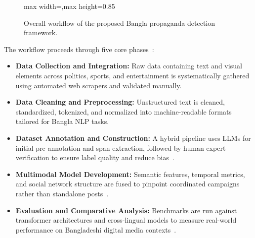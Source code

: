 \begin{figure}[H]
\begin{adjustbox}{max width=\textwidth,max height=0.85\textheight}
\end{adjustbox}
\caption{Overall workflow of the proposed Bangla propaganda detection framework.}
\label{fig:workflow}
\end{figure}

The workflow proceeds through five core phases~\cite{ng2023}:
\begin{itemize}
  \item \textbf{Data Collection and Integration:} Raw data containing text and
        visual elements across politics, sports, and entertainment is
        systematically gathered using automated web scrapers and validated
        manually.
  \item \textbf{Data Cleaning and Preprocessing:} Unstructured text is cleaned,
        standardized, tokenized, and normalized into machine-readable formats
        tailored for Bangla NLP tasks.
  \item \textbf{Dataset Annotation and Construction:} A hybrid pipeline uses LLMs
        for initial pre-annotation and span extraction, followed by human expert
        verification to ensure label quality and reduce
        bias~\cite{hossain2020}.
  \item \textbf{Multimodal Model Development:} Semantic features, temporal metrics,
        and social network structure are fused to pinpoint coordinated campaigns
        rather than standalone posts~\cite{ng2023}.
  \item \textbf{Evaluation and Comparative Analysis:} Benchmarks are run against
        transformer architectures and cross-lingual models to measure real-world
        performance on Bangladeshi digital media contexts~\cite{hossain2020}.
\end{itemize}

